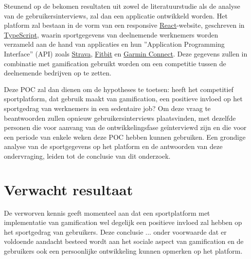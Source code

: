 Steunend op de bekomen resultaten uit zowel de literatuurstudie als de analyse van de gebruikersinterviews, zal dan een applicatie ontwikkeld worden. Het platform zal bestaan in de vorm van een responsive \href{https://react.dev/}{React}-website, geschreven in \href{https://www.typescriptlang.org/}{TypeScript}, waarin sportgegevens van deelnemende werknemers worden verzameld aan de hand van applicaties en hun ''Application Programming Interface'' (API) zoals \href{https://developers.strava.com/}{Strava}, \href{https://dev.fitbit.com/}{Fitbit} en \href{https://developer.garmin.com/gc-developer-program/overview/}{Garmin Connect}. Deze gegevens zullen in combinatie met gamification gebruikt worden om een competitie tussen de deelnemende bedrijven op te zetten.

Deze POC zal dan dienen om de hypotheses te toetsen: heeft het competitief sportplatform, dat gebruik maakt van gamification, een positieve invloed op het sportgedrag van werknemers in een sedentaire job? Om deze vraag te beantwoorden zullen opnieuw gebruikersinterviews plaatsvinden, met dezelfde personen die voor aanvang van de ontwikkelingsfase geïnterviewd zijn en die voor een periode van enkele weken deze POC hebben kunnen gebruiken. Een grondige analyse van de sportgegevens op het platform en de antwoorden van deze ondervraging, leiden tot de conclusie van dit onderzoek.



\section{Verwacht resultaat}%
\label{sec:verwachte_resultaten}

De verworven kennis geeft momenteel aan dat een sportplatform met implementatie van gamification wel degelijk een positieve invloed zal hebben op het sportgedrag van gebruikers. Deze conclusie ... onder voorwaarde dat er voldoende aandacht besteed wordt aan het sociale aspect van gamification en de gebruikers ook een persoonlijke ontwikkeling kunnen opmerken op het platform.


